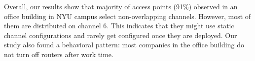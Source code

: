 Overall, our results show that majority of access points (91\%) observed in an office building in NYU campus select non-overlapping channels. However, most of them are distributed on channel 6. This indicates that they might use static channel configurations and rarely get configured once they are deployed. Our study also found a behavioral pattern: most companies in the office building do not turn off routers after work time.   